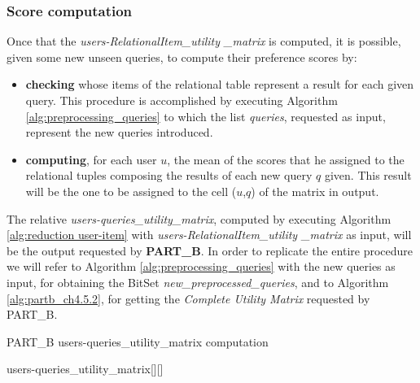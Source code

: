 \subsubsection{Score computation}
Once that the \textit{users-RelationalItem\_utility \_matrix} is computed, it is possible, given some new unseen queries, to compute their preference scores by:
\begin{itemize}
    \item \textbf{checking} whose items of the relational table represent a result for each given query. This procedure is accomplished by executing Algorithm \ref{alg:preprocessing_queries} to which the list \textit{queries}, requested as input, represent the new queries introduced.
    \item \textbf{computing}, for each user $u$, the mean of the scores that he assigned to the relational tuples composing the results of each new query $q$ given. This result will be the one to be assigned to the cell ($u$,$q$) of the matrix in output.
\end{itemize}
The relative \textit{users-queries\_utility\_matrix}, computed by executing Algorithm \ref{alg:reduction user-item} with \textit{users-RelationalItem\_utility \_matrix} as input, will be the output requested by \textbf{PART\_B}. In order to replicate the entire procedure we will refer to Algorithm \ref{alg:preprocessing_queries} with the new queries as input, for obtaining the BitSet \textit{new\_preprocessed\_queries}, and to Algorithm \ref{alg:partb_ch4.5.2}, for getting the \textit{Complete Utility Matrix} requested by PART\_B.

\begin{algorithm}
\caption{PART\_B users-queries\_utility\_matrix computation}\label{alg:partb_ch4.5.2}
users-queries\_utility\_matrix[][] \\

\end{algorithm}

